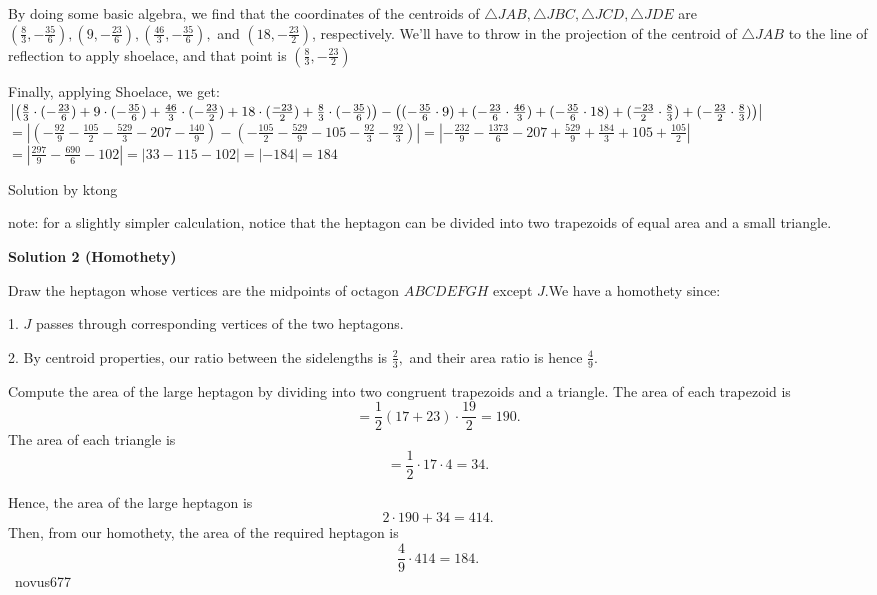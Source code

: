 \begin{enumerate}
 By doing some basic algebra, we find that the coordinates of the centroids of $\bigtriangleup JAB, \bigtriangleup JBC, \bigtriangleup JCD, \bigtriangleup JDE$ are $\left(\frac{8}{3}, -\frac{35}{6}\right), \left(9, -\frac{23}{6}\right), \left(\frac{46}{3}, -\frac{35}{6}\right),$ and $\left(18, -\frac{23}{2}\right)$, respectively. We'll have to throw in the projection of the centroid of $\bigtriangleup JAB$ to the line of reflection to apply shoelace, and that point is $\left( \frac{8}{3}, -\frac{23}{2}\right)$

 Finally, applying Shoelace, we get: $\left|\left(\frac{8}{3}\cdot (-\frac{23}{6})+9\cdot (-\frac{35}{6})+\frac{46}{3}\cdot (-\frac{23}{2})+18\cdot (\frac{-23}{2})+\frac{8}{3}\cdot (-\frac{35}{6})\right) - \left((-\frac{35}{6}\cdot 9) +\\(-\frac{23}{6}\cdot \frac{46}{3})+ (-\frac{35}{6}\cdot 18)+(\frac{-23}{2}\cdot \frac{8}{3})+(-\frac{23}{2}\cdot \frac{8}{3})\right)\right|$$=\left|\left(-\frac{92}{9}-\frac{105}{2}-\frac{529}{3}-207-\frac{140}{9}\right)-\left(-\frac{105}{2}-\frac{529}{9}-105-\frac{92}{3}-\frac{92}{3}\right)\right|$$=\left|-\frac{232}{9}-\frac{1373}{6}-207+\frac{529}{9}+\frac{184}{3}+105+\frac{105}{2}\right|$$=\left|\frac{297}{9}-\frac{690}{6}-102\right|=\left| 33-115-102\right|=\left|-184\right|=\boxed{184}$

 Solution by ktong

 note: for a slightly simpler calculation, notice that the heptagon can be divided into two trapezoids of equal area and a small triangle.

 



\textbf{Solution 2 (Homothety)}

Draw the heptagon whose vertices are the midpoints of octagon $ABCDEFGH$ except $J$.We have a homothety since:

 1. $J$ passes through corresponding vertices of the two heptagons.

 2. By centroid properties, our ratio between the sidelengths is $\frac{2}{3},$ and their area ratio is hence $\frac{4}{9}.$ 

 Compute the area of the large heptagon by dividing into two congruent trapezoids and a triangle. The area of each trapezoid is 
 \[= \frac{1}{2}(17+23)\cdot \frac{19}{2}=190.\] The area of each triangle is 
 \[=  \frac{1}{2}\cdot 17\cdot 4=34.\]

 Hence, the area of the large heptagon is 
 \[2\cdot 190+34=414.\] Then, from our homothety, the area of the required heptagon is 
 \[\frac{4}{9}\cdot 414=\boxed{184}.\]~novus677


\end{enumerate}
